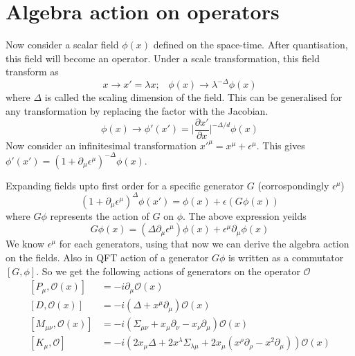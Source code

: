 \documentclass[12pt,a4paper,oneside]{book}
\theoremstyle{definition}
\begin{document}
    \section{Algebra action on operators}
    Now consider a scalar field $\phi(x)$ defined on the space-time. After quantisation, this field will become an operator. Under a scale transformation, this field transform as 
    \begin{equation}
        x\to x'=\lambda x;\hspace{10pt} \phi(x)\to \lambda^{-\Delta}\phi(x)
    \end{equation}
    where $\Delta $ is called the scaling dimension of the field. This can be generalised for any transformation by replacing the factor with the Jacobian.
    \begin{equation}
        \phi(x)\rightarrow\phi'(x') = \bigg\lvert \frac{\partial x'}{\partial x} \bigg\rvert^{-\Delta/d} \phi(x)
    \end{equation}
    Now consider an infinitesimal transformation $x'^{\mu} = x^{\mu} + \epsilon^{\mu}$. This gives $\phi'(x') = (1+\partial_{\mu}\epsilon^{\mu})^{-\Delta}\phi(x)$.\par
    Expanding fields upto first order for a specific generator $G$ (corrospondingly $\epsilon^{\mu}$)
    \begin{equation}
        (1+\partial_{\mu}\epsilon^{\mu})^{\Delta} \phi(x') = \phi(x) + \epsilon(G\phi(x))
    \end{equation}
    where $G\phi$ represents the action of $G$ on $\phi$. The above expression yeilds
    \begin{equation}
        G\phi(x) = (\Delta\partial_{\mu}\epsilon^{\mu})\phi(x) + \epsilon^{\mu}\partial_{\mu}\phi(x)
    \end{equation}
    We know $\epsilon^{\mu}$ for each generators, using that now we can derive the algebra action on the fields. Also in QFT action of a generator $G\phi$ is written as a commutator $[G,\phi]$. So we get the following actions of generators on the operator $\mathcal{O}$
    \begin{subequations}
    \begin{align}\label{algebra-action}
        \left[P_{\mu},\mathcal{O}(x) \right] &= -i \partial_{\mu} \mathcal{O}(x)\\
        \left[D,\mathcal{O}(x) \right] &= -i\left(\Delta + x^{\mu}\partial_{\mu} \right)\mathcal{O}(x)\\
        \left[M_{\mu\nu},\mathcal{O}(x) \right] &= -i \left(\Sigma_{\mu\nu} +x_{\mu}\partial_{\nu} - x_{\nu}\partial_{\mu} \right)\mathcal{O}(x)\\
        \left[K_{\mu},\mathcal{O} \right] &= -i\left(2x_{\mu}\Delta + 2x^{\lambda}\Sigma_{\lambda\mu} + 2x_{\mu}(x^{\rho}\partial_{\rho} - x^2\partial_{\mu}) \right)\mathcal{O}(x)
     \end{align}
    \end{subequations}
\end{document}
